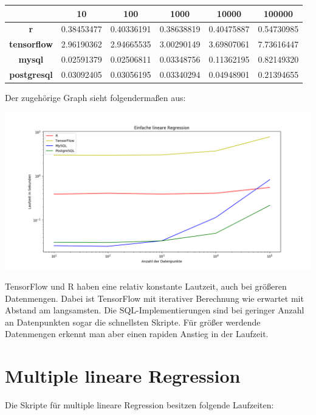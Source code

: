 \begin{center}
  \begin{tabular}{|c|c|c|c|c|c|}\hline
    & \textbf{10} & \textbf{100} & \textbf{1000} & \textbf{10000} & \textbf{100000} \\ \hline
    \textbf{r} & 0.38453477 & 0.40336191 & 0.38638819 & 0.40475887 & 0.54730985 \\ \hline
    \textbf{tensorflow} & 2.96190362 & 2.94665535 & 3.00290149 & 3.69807061 & 7.73616447 \\ \hline
    \textbf{mysql} & 0.02591379 & 0.02506811 & 0.03348756 & 0.11362195 & 0.82149320 \\ \hline
    \textbf{postgresql} & 0.03092405 & 0.03056195 & 0.03340294 & 0.04948901 & 0.21394655 \\ \hline
  \end{tabular}
\end{center}

Der zugehörige Graph sieht folgendermaßen aus:

\includegraphics[width=\textwidth]{simpleLinearRegressionBenchmark}

TensorFlow und R haben eine relativ konstante Lautzeit, auch bei größeren Datenmengen. Dabei ist TensorFlow mit iterativer Berechnung wie erwartet mit Abstand am langsamsten. Die SQL-Implementierungen sind bei geringer Anzahl an Datenpunkten sogar die schnellsten Skripte. Für größer werdende Datenmengen erkennt man aber einen rapiden Anstieg in der Laufzeit.

\section{Multiple lineare Regression}
\label{section:4:2}

Die Skripte für multiple lineare Regression besitzen folgende Laufzeiten:

